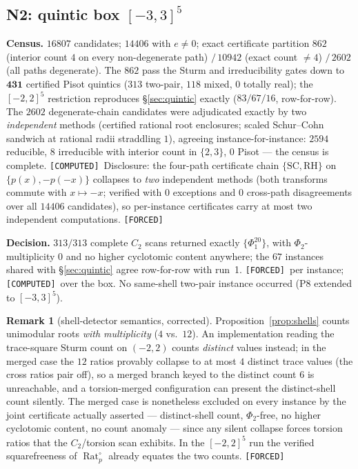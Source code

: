 \documentclass[11pt]{article}
\newcommand{\F}{\textnormal{\texttt{[FORCED]}}}
\newcommand{\C}{\textnormal{\texttt{[COMPUTED]}}}
\newcommand{\Rat}{\operatorname{Rat}}
\theoremstyle{definition}
\newtheorem{remark}[theorem]{Remark}
\begin{document}
\subsection{N2: quintic box $[-3,3]^5$}
\textbf{Census.} $16807$ candidates; $14406$ with $e\neq0$; exact certificate
partition $862$ (interior count $4$ on every non-degenerate path)
$/\,10942$ (exact count $\neq4$) $/\,2602$ (all paths degenerate). The $862$
pass the Sturm and irreducibility gates down to $\mathbf{431}$ certified
Pisot quintics ($313$ two-pair, $118$ mixed, $0$ totally real); the
$[-2,2]^5$ restriction reproduces \S\ref{sec:quintic} exactly ($83/67/16$,
row-for-row). The $2602$ degenerate-chain candidates were adjudicated exactly
by two \emph{independent} methods (certified rational root enclosures;
scaled Schur--Cohn sandwich at rational radii straddling $1$), agreeing
instance-for-instance: $2594$ reducible, $8$ irreducible with interior count
in $\{2,3\}$, $0$ Pisot --- the census is complete. \C\ Disclosure: the
four-path certificate chain $\{\mathrm{SC},\mathrm{RH}\}$ on
$\{p(x),-p(-x)\}$ collapses to \emph{two} independent methods (both
transforms commute with $x\mapsto-x$; verified with $0$ exceptions and $0$
cross-path disagreements over all $14406$ candidates), so per-instance
certificates carry at most two independent computations. \F

\textbf{Decision.} $313/313$ complete $C_2$ scans returned exactly
$\{\Phi_1^{20}\}$, with $\Phi_2$-multiplicity $0$ and no higher cyclotomic
content anywhere; the $67$ instances shared with \S\ref{sec:quintic} agree
row-for-row with run~1. \F\ per instance; \C\ over the box. No same-shell
two-pair instance occurred (P8 extended to $[-3,3]^5$).

\begin{remark}[shell-detector semantics, corrected]\label{rem:detector}
Proposition~\ref{prop:shells} counts unimodular roots \emph{with
multiplicity} ($4$ vs.\ $12$). An implementation reading the trace-square
Sturm count on $(-2,2)$ counts \emph{distinct} values instead; in the merged
case the $12$ ratios provably collapse to at most $4$ distinct trace values
(the cross ratios pair off), so a merged branch keyed to the distinct count
$6$ is unreachable, and a torsion-merged configuration can present the
distinct-shell count silently. The merged case is nonetheless excluded on
every instance by the joint certificate actually asserted --- distinct-shell
count, $\Phi_2$-free, no higher cyclotomic content, no count anomaly ---
since any silent collapse forces torsion ratios that the $C_2$/torsion scan
exhibits. In the $[-2,2]^5$ run the verified squarefreeness of
$\Rat_p^{\circ}$ already equates the two counts. \F
\end{remark}
\end{document}
